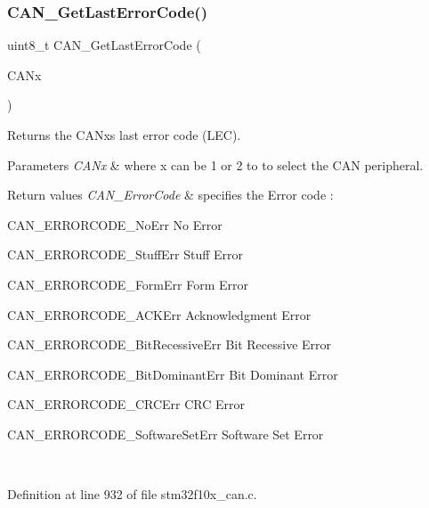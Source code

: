 \subsubsection{\texorpdfstring{C\+A\+N\+\_\+\+Get\+Last\+Error\+Code()}{CAN\_GetLastErrorCode()}}
{\footnotesize\ttfamily uint8\+\_\+t C\+A\+N\+\_\+\+Get\+Last\+Error\+Code (\begin{DoxyParamCaption}\item[{\hyperlink{struct_c_a_n___type_def}{C\+A\+N\+\_\+\+Type\+Def} $\ast$}]{C\+A\+Nx }\end{DoxyParamCaption})}



Returns the C\+A\+Nx\textquotesingle{}s last error code (L\+EC). 


\begin{DoxyParams}{Parameters}
{\em C\+A\+Nx} & where x can be 1 or 2 to to select the C\+AN peripheral. \\
\hline
\end{DoxyParams}

\begin{DoxyRetVals}{Return values}
{\em C\+A\+N\+\_\+\+Error\+Code} & specifies the Error code \+:
\begin{DoxyItemize}
\item C\+A\+N\+\_\+\+E\+R\+R\+O\+R\+C\+O\+D\+E\+\_\+\+No\+Err No Error
\item C\+A\+N\+\_\+\+E\+R\+R\+O\+R\+C\+O\+D\+E\+\_\+\+Stuff\+Err Stuff Error
\item C\+A\+N\+\_\+\+E\+R\+R\+O\+R\+C\+O\+D\+E\+\_\+\+Form\+Err Form Error
\item C\+A\+N\+\_\+\+E\+R\+R\+O\+R\+C\+O\+D\+E\+\_\+\+A\+C\+K\+Err Acknowledgment Error
\item C\+A\+N\+\_\+\+E\+R\+R\+O\+R\+C\+O\+D\+E\+\_\+\+Bit\+Recessive\+Err Bit Recessive Error
\item C\+A\+N\+\_\+\+E\+R\+R\+O\+R\+C\+O\+D\+E\+\_\+\+Bit\+Dominant\+Err Bit Dominant Error
\item C\+A\+N\+\_\+\+E\+R\+R\+O\+R\+C\+O\+D\+E\+\_\+\+C\+R\+C\+Err C\+RC Error
\item C\+A\+N\+\_\+\+E\+R\+R\+O\+R\+C\+O\+D\+E\+\_\+\+Software\+Set\+Err Software Set Error 
\end{DoxyItemize}\\
\hline
\end{DoxyRetVals}


Definition at line 932 of file stm32f10x\+\_\+can.\+c.

\mbox{\label{group___c_a_n___exported___functions_ga85ee0c35bf7ca15d4e4c862eef534843}} 
